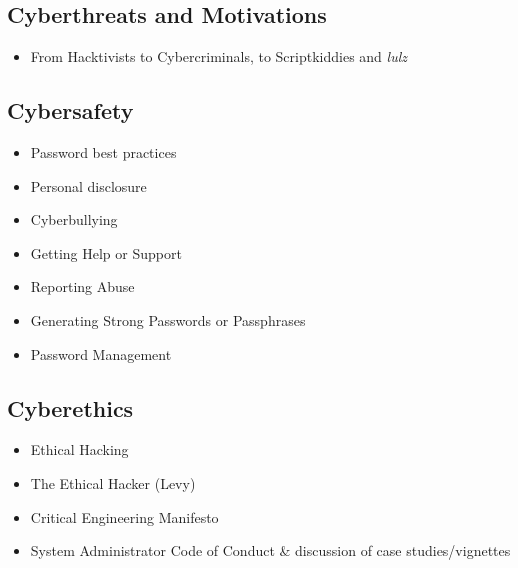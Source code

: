 \documentclass[letterpaper,10pt,english]{sphinxmanual}
\begin{document}
\subsection{Cyberthreats and Motivations}
\label{cybersecurity:cyberthreats-and-motivations}\begin{itemize}
\item {} 
From Hacktivists to Cybercriminals, to Scriptkiddies and \emph{lulz}

\end{itemize}


\subsection{Cybersafety}
\label{cybersecurity:cybersafety}\begin{itemize}
\item {} 
Password best practices

\item {} 
Personal disclosure

\item {} 
Cyberbullying

\item {} 
Getting Help or Support

\item {} 
Reporting Abuse

\item {} 
Generating Strong Passwords or Passphrases

\item {} 
Password Management

\end{itemize}


\subsection{Cyberethics}
\label{cybersecurity:cyberethics}\begin{itemize}
\item {} 
Ethical Hacking

\item {} 
The Ethical Hacker (Levy)

\item {} 
Critical Engineering Manifesto

\item {} 
System Administrator Code of Conduct \& discussion of case studies/vignettes

\end{itemize}
\end{document}
